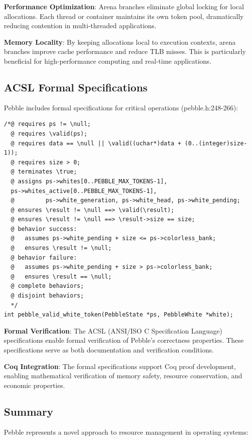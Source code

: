 \documentclass[11pt,letterpaper]{article}
\begin{document}
\textbf{Performance Optimization}: Arena branches eliminate global locking for local allocations. Each thread or container maintains its own token pool, dramatically reducing contention in multi-threaded applications.

\textbf{Memory Locality}: By keeping allocations local to execution contexts, arena branches improve cache performance and reduce TLB misses. This is particularly beneficial for high-performance computing and real-time applications.

\subsection{ACSL Formal Specifications}

Pebble includes formal specifications for critical operations (pebble.h:248-266):

\begin{lstlisting}
/*@ requires ps != \null;
  @ requires \valid(ps);
  @ requires data == \null || \valid((uchar*)data + (0..(integer)size-1));
  @ requires size > 0;
  @ terminates \true;
  @ assigns ps->whites[0..PEBBLE_MAX_TOKENS-1],
  ps->whites_active[0..PEBBLE_MAX_TOKENS-1],
  @         ps->white_generation, ps->white_head, ps->white_pending;
  @ ensures \result != \null ==> \valid(\result);
  @ ensures \result != \null ==> \result->size == size;
  @ behavior success:
  @   assumes ps->white_pending + size <= ps->colorless_bank;
  @   ensures \result != \null;
  @ behavior failure:
  @   assumes ps->white_pending + size > ps->colorless_bank;
  @   ensures \result == \null;
  @ complete behaviors;
  @ disjoint behaviors;
  */
int pebble_valid_white_token(PebbleState *ps, PebbleWhite *white);
\end{lstlisting}

\textbf{Formal Verification}: The ACSL (ANSI/ISO C Specification Language) specifications enable formal verification of Pebble's correctness properties. These specifications serve as both documentation and verification conditions.

\textbf{Coq Integration}: The formal specifications support Coq proof development, enabling mathematical verification of memory safety, resource conservation, and economic properties.

\subsection{Summary}

Pebble represents a novel approach to resource management in operating systems:
\end{document}
